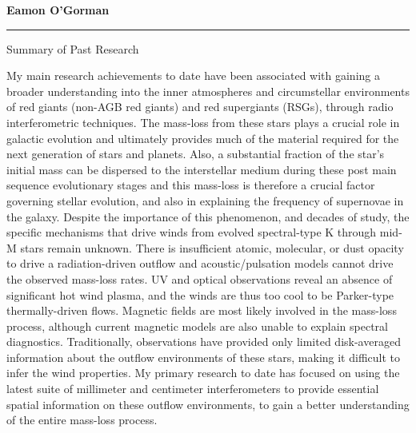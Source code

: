 \documentclass[11pt]{letter} %
\begin{document}




\begin{flushleft}
{\large\bf Eamon O'Gorman}
\end{flushleft}
\medskip\hrule height 1pt
\begin{flushright}


\end{flushright} 
{\Large 
\begin{center}
Summary of Past Research
\end{center}
}

My main research achievements to date have been associated with gaining a broader understanding into the inner atmospheres and circumstellar environments of red giants (non-AGB red giants) and red supergiants (RSGs), through radio interferometric techniques. The mass-loss from these stars plays a crucial role in galactic evolution and ultimately provides much of the material required for the next generation of stars and planets. Also, a substantial fraction of the star's initial mass can be dispersed to the interstellar medium during these post main sequence evolutionary stages and this mass-loss is therefore a crucial factor governing stellar evolution, and also in explaining the frequency of supernovae in the galaxy. Despite the importance of this phenomenon, and decades of study, the specific mechanisms that drive winds from evolved spectral-type K through mid-M stars remain unknown. There is insufficient atomic, molecular, or dust opacity to drive a radiation-driven outflow and acoustic/pulsation models cannot drive the observed mass-loss rates. UV and optical observations reveal an absence of significant hot wind plasma, and the winds are thus too cool to be Parker-type thermally-driven flows. Magnetic fields are most likely involved in the mass-loss process, although current magnetic models are also unable to explain spectral diagnostics. Traditionally, observations have provided only limited disk-averaged information about the outflow environments of these stars, making it difficult to infer the wind properties. My primary research to date has focused on using the latest suite of millimeter and centimeter interferometers to provide essential spatial information on these outflow environments, to gain a better understanding of the entire mass-loss process.
\end{document}
